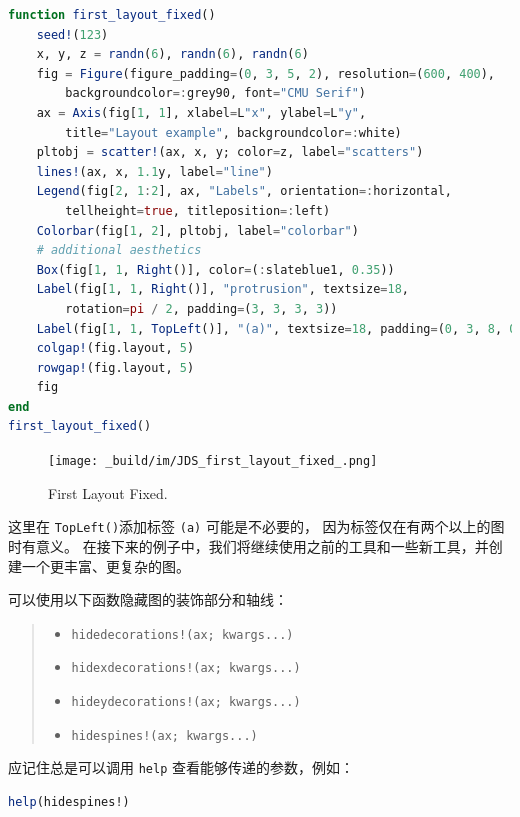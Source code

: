 \documentclass[
  notoc %
]{tufte-book}
\providecommand{\tightlist}{%
  \setlength{\itemsep}{0pt}\setlength{\parskip}{0pt}
}
\newcommand{\passthrough}[1]{#1}
\begin{document}
\begin{lstlisting}[language=Julia]
function first_layout_fixed()
    seed!(123)
    x, y, z = randn(6), randn(6), randn(6)
    fig = Figure(figure_padding=(0, 3, 5, 2), resolution=(600, 400),
        backgroundcolor=:grey90, font="CMU Serif")
    ax = Axis(fig[1, 1], xlabel=L"x", ylabel=L"y",
        title="Layout example", backgroundcolor=:white)
    pltobj = scatter!(ax, x, y; color=z, label="scatters")
    lines!(ax, x, 1.1y, label="line")
    Legend(fig[2, 1:2], ax, "Labels", orientation=:horizontal,
        tellheight=true, titleposition=:left)
    Colorbar(fig[1, 2], pltobj, label="colorbar")
    # additional aesthetics
    Box(fig[1, 1, Right()], color=(:slateblue1, 0.35))
    Label(fig[1, 1, Right()], "protrusion", textsize=18,
        rotation=pi / 2, padding=(3, 3, 3, 3))
    Label(fig[1, 1, TopLeft()], "(a)", textsize=18, padding=(0, 3, 8, 0))
    colgap!(fig.layout, 5)
    rowgap!(fig.layout, 5)
    fig
end
first_layout_fixed()
\end{lstlisting}

\begin{figure}
\hypertarget{fig:first_layout_fixed}{%
\centering
\texttt{[image: \_build/im/JDS\_first\_layout\_fixed\_.png]}
\caption{First Layout Fixed.}\label{fig:first_layout_fixed}
}
\end{figure}

这里在 \passthrough{\lstinline!TopLeft()!}添加标签
\passthrough{\lstinline!(a)!} 可能是不必要的，
因为标签仅在有两个以上的图时有意义。
在接下来的例子中，我们将继续使用之前的工具和一些新工具，并创建一个更丰富、更复杂的图。

可以使用以下函数隐藏图的装饰部分和轴线：

\begin{quote}
\begin{itemize}
\tightlist
\item
  \passthrough{\lstinline"hidedecorations!(ax; kwargs...)"}
\item
  \passthrough{\lstinline"hidexdecorations!(ax; kwargs...)"}
\item
  \passthrough{\lstinline"hideydecorations!(ax; kwargs...)"}
\item
  \passthrough{\lstinline"hidespines!(ax; kwargs...)"}
\end{itemize}
\end{quote}

应记住总是可以调用 \passthrough{\lstinline!help!}
查看能够传递的参数，例如：

\begin{lstlisting}[language=Julia]
help(hidespines!)
\end{lstlisting}
\end{document}
